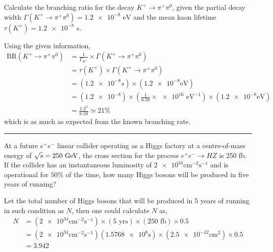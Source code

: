 \begin{problem}{3.3}
Calculate the branching ratio for the decay $K^+\to\pi^+\pi^0$, given the partial decay width $\Gamma(K^+\to\pi^+\pi^0)=\num{1.2e-8} \text{ eV}$
and the mean kaon lifetime $\tau(K^+)=\num{1.2e-8}$ s.
\end{problem}
    
\begin{solution}
Using the given information, 
\begin{align*}
    \text{BR}\left(K^+\to\pi^+\pi^0\right) &= \frac{1}{\Gamma_{K^+}} \times \Gamma\left( K^+ \to \pi^+\pi^0 \right) \\[0.15in]
                                           &= \tau( K^+ )\times \Gamma\left( K^+ \to \pi^+\pi^0 \right) \\[0.15in]
                                           &= \left( \num{1.2e-8}\unit{ s} \right) \times \left( \num{1.2e-8} \text{eV}\right) \\[0.15in]
                                           &= \left( \num{1.2e-8} \right)  \times \left( \frac{1}{6.58} \times \num{e16} \text{ eV}^{-1} \right)  \times \left( \num{1.2e-8} \text{eV}\right) \\[0.15in]
                                           &= \frac{1.2^2}{6.58} \simeq 21\%
\end{align*}
which is as much as expected from the known branching rate.\\
\end{solution} 
\noindent\rule{7in}{1.5pt}
    

\begin{problem}{3.4}
At a future $e^+e^-$ linear collider operating as a Higgs factory at a centre-of-mass energy of $\sqrt{s}=250\text{ GeV}$, the cross section
for the process $e^+e^-\to HZ$ is 250 fb. If the collider has an instantaneous luminosity of $\num{2e34}\unit{\centi\metre^{-2}\second^{-1}}$
and is operational for $50\%$ of the time, how many Higgs bosons will be produced in five years of running?
\end{problem}
        
\begin{solution}
Let the total number of Higgs bosons that will be produced in 5 years of running in such condition as $N$, then one could calculate $N$ as,
\begin{align*}
    N &= \left( \num{2e34}\unit{\centi\metre^{-2}\second^{-1}} \right) \times \left( 5 \text{ yrs} \right) \times \left( 250 \text{ fb} \right) \times 0.5 \\[0.15in]
      &= \left( \num{2e34}\unit{\centi\metre^{-2}\second^{-1}} \right) \left( \num{1.5768e8} \unit{\second} \right) \times \left( \num{2.5e-42} \unit{\centi\metre^2} \right) \times 0.5 \\[0.15in]
      &= \num{3.942}
\end{align*}
\end{solution} 

